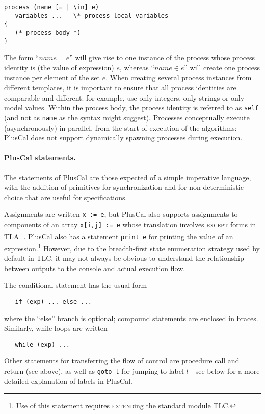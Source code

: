 \documentclass[11pt,fleqn]{article}
\newcommand{\tlaplus}{TLA\textsuperscript{+}\xspace}
\newcommand{\kw}[1]{\textnormal{\textsc{#1}}}
\newcommand{\EXCEPT}{\kw{except}}
\newcommand{\EXTEND}{\kw{extend}}
\begin{document}
\begin{verbatim}
process (name [= | \in] e)
   variables ...   \* process-local variables
{
   (* process body *)
}
\end{verbatim}

The form ``$name = e$'' will give rise to one instance of the process whose
process identity is (the value of expression) $e$, whereas ``$name \in e$'' will
create one process instance per element of the set $e$. When creating several
process instances from different templates, it is important to ensure that all
process identities are comparable and different: for example, use only integers,
only strings or only model values. Within the process body, the process identity
is referred to as \verb|self| (and not as \verb|name| as the syntax might
suggest). Processes conceptually execute (asynchronously) in parallel, from the
start of execution of the algorithms: PlusCal does not support dynamically
spawning processes during execution.


\paragraph{PlusCal statements.}

The statements of PlusCal are those expected of a simple imperative language,
with the addition of primitives for synchronization and for non-deterministic
choice that are useful for specifications.

Assignments are written \verb|x := e|, but PlusCal also supports assignments to
components of an array \verb|x[i,j] := e| whose translation involves \EXCEPT{}
forms in \tlaplus. PlusCal also has a statement \verb|print e| for printing the
value of an expression.\footnote{Use of this statement requires \EXTEND{}ing the
  standard module TLC.} However, due to the breadth-first state enumeration
strategy used by default in TLC, it may not always be obvious to understand
the relationship between outputs to the console and actual execution flow.

The conditional statement has the usual form
%
\begin{verbatim}
   if (exp) ... else ...
\end{verbatim}
%
where the ``else'' branch is optional; compound statements are enclosed in
braces. Similarly, while loops are written
%
\begin{verbatim}
   while (exp) ...
\end{verbatim}

Other statements for transferring the flow of control are procedure call and
return (see above), as well as \verb|goto l| for jumping to label $l$---see
below for a more detailed explanation of labels in PlusCal.
\end{document}
